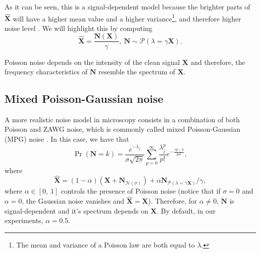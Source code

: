 \documentclass{article}
\begin{document}
As it can be seen, this is a signal-dependent model because the
brighter parts of $\hat{\mathbf X}$ will have a higher mean value and
a higher variance\footnote{The mean and variance of a Poisson law are
  both equal to $\lambda$.}, and therefore higher noise level
\cite{meiniel2018denoising}. We will highlight this by computing
\begin{equation}
  \hat{\mathbf{X}} = \frac{\mathbf{N}(\mathbf{X})}{\gamma},~\mathbf{N}\sim\mathcal{P}(\lambda=\gamma\mathbf{X}).
\end{equation}

Poisson noise depends on the intensity of the clean signal $\mathbf{X}$ and
therefore, the frequency characteristics of $\mathbf{N}$ resemble the
spectrum of $\mathbf{X}$.

\subsection{Mixed Poisson-Gaussian noise}
A more realistic noise model in microscopy consists in a combination
of both Poisson and ZAWG noise, which is commonly called mixed
Poisson-Gaussian (MPG) noise \cite{meiniel2018denoising}. In this
case, we have that
\begin{equation}
  \Pr({\mathbf N}{=}k) = \frac{e^{-\lambda_j}}{\sigma\sqrt{2\pi}}\sum_{p=0}^{\infty}\frac{\lambda_j^p}{p!} e^{-\frac{\gamma p - k}{2\sigma^2}},
  \label{eq:PN}
\end{equation}
where
\begin{equation}
  \hat{\mathbf X} = (1-\alpha)(\mathbf{X} + {\mathbf N}_{\mathcal{N}(\sigma)}) + \alpha{\mathbf N}_{\mathcal{P}(\lambda=\gamma\mathbf{X})}/\gamma,
  \label{eq:MPG_noise_model} 
\end{equation}
where $\alpha\in[0,~1]$ controls the presence of Poisson noise (notice
that if $\sigma=0$ and $\alpha=0$, the Gaussian noise vanishes and
$\hat{\mathbf{X}}=\mathbf{X}$).  Therefore, for $\alpha\neq 0$,
${\mathbf{N}}$ is signal-dependent and it's spectrum depends on
$\mathbf{X}$. By default, in our experiments, $\alpha=0.5$.

\end{document}
